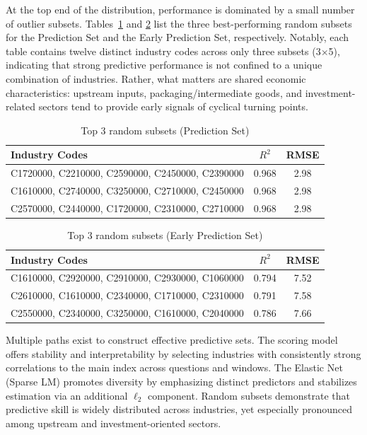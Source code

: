 \vspace{\baselineskip}
At the top end of the distribution, performance is dominated by a small number of outlier subsets. Tables~\ref{tab:random_subsets} and \ref{tab:random_subsets2} list the three best-performing random subsets for the Prediction Set and the Early Prediction Set, respectively. Notably, each table contains twelve distinct industry codes across only three subsets (3$\times$5), indicating that strong predictive performance is not confined to a unique combination of industries. Rather, what matters are shared economic characteristics: upstream inputs, packaging/intermediate goods, and investment-related sectors tend to provide early signals of cyclical turning points.

\begin{table}[H]
    \centering
    \caption{Top 3 random subsets (Prediction Set)}
    \label{tab:random_subsets}
    \small
    \begin{tabularx}{0.9\linewidth}{Xcc}
        \toprule
        \textbf{Industry Codes} & \textbf{$R^2$} & \textbf{RMSE} \\
        \midrule
        C1720000, C2210000, C2590000, C2450000, C2390000 & 0.968 & 2.98 \\
        C1610000, C2740000, C3250000, C2710000, C2450000 & 0.968 & 2.98 \\
        C2570000, C2440000, C1720000, C2310000, C2710000 & 0.968 & 2.98 \\
        \bottomrule
    \end{tabularx}
\end{table}

\begin{table}[H]
    \centering
    \caption{Top 3 random subsets (Early Prediction Set)}
    \label{tab:random_subsets2}
    \small
    \begin{tabularx}{0.9\linewidth}{Xcc}
        \toprule
        \textbf{Industry Codes} & \textbf{$R^2$} & \textbf{RMSE} \\
        \midrule
        C1610000, C2920000, C2910000, C2930000, C1060000 & 0.794 & 7.52 \\
        C2610000, C1610000, C2340000, C1710000, C2310000 & 0.791 & 7.58 \\
        C2550000, C2340000, C3250000, C1610000, C2040000 & 0.786 & 7.66 \\
        \bottomrule
    \end{tabularx}
\end{table}


Multiple paths exist to construct effective predictive sets. The scoring model offers stability and interpretability by selecting industries with consistently strong correlations to the main index across questions and windows. The Elastic Net (Sparse LM) promotes diversity by emphasizing distinct predictors and stabilizes estimation via an additional $\ell_2$ component. Random subsets demonstrate that predictive skill is widely distributed across industries, yet especially pronounced among upstream and investment-oriented sectors.

